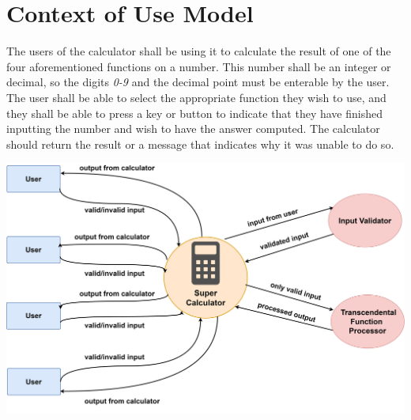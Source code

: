 \documentclass[letterpaper, 11pt]{report}
\begin{document}
\section*{Context of Use Model}
\normalsize{The users of the calculator shall be using it to calculate the result of one of the four aforementioned functions on a number. This number shall be an integer or decimal, so the digits \textit{0-9} and the decimal point must be enterable by the user. The user shall be able to select the appropriate function they wish to use, and they shall be able to press a key or button to indicate that they have finished inputting the number and wish to have the answer computed. The calculator should return the result or a message that indicates why it was unable to do so.}
\begin{center}
\includegraphics[width=15cm]{context_diagram}
\end{center}
\end{document}
